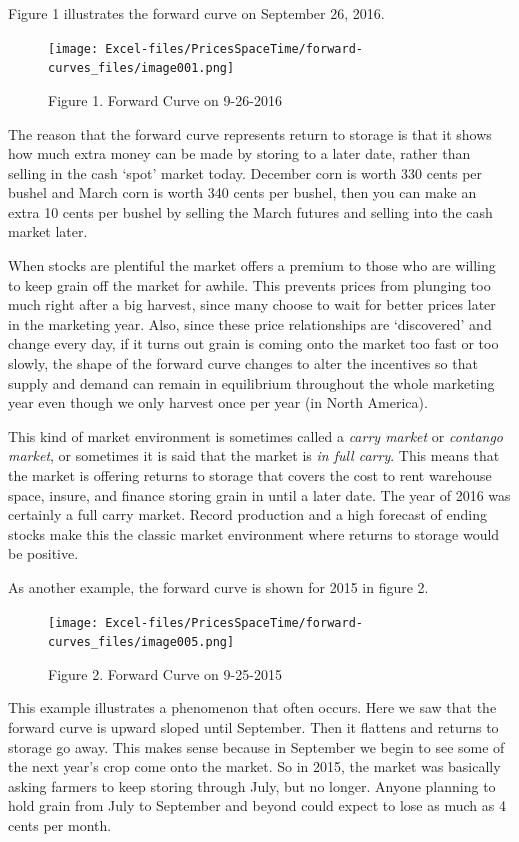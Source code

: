 \documentclass[
]{book}
\begin{document}
Figure 1 illustrates the forward curve on September 26, 2016.

\begin{figure}
\centering
\texttt{[image: Excel-files/PricesSpaceTime/forward-curves\_files/image001.png]}
\caption{Figure 1. Forward Curve on 9-26-2016}
\end{figure}

The reason that the forward curve represents return to storage is that it shows how much extra money can be made by storing to a later date, rather than selling in the cash `spot' market today. December corn is worth 330 cents per bushel and March corn is worth 340 cents per bushel, then you can make an extra 10 cents per bushel by selling the March futures and selling into the cash market later.

When stocks are plentiful the market offers a premium to those who are willing to keep grain off the market for awhile. This prevents prices from plunging too much right after a big harvest, since many choose to wait for better prices later in the marketing year. Also, since these price relationships are `discovered' and change every day, if it turns out grain is coming onto the market too fast or too slowly, the shape of the forward curve changes to alter the incentives so that supply and demand can remain in equilibrium throughout the whole marketing year even though we only harvest once per year (in North America).

This kind of market environment is sometimes called a \emph{carry market} or \emph{contango market}, or sometimes it is said that the market is \emph{in full carry}. This means that the market is offering returns to storage that covers the cost to rent warehouse space, insure, and finance storing grain in until a later date. The year of 2016 was certainly a full carry market. Record production and a high forecast of ending stocks make this the classic market environment where returns to storage would be positive.

As another example, the forward curve is shown for 2015 in figure 2.

\begin{figure}
\centering
\texttt{[image: Excel-files/PricesSpaceTime/forward-curves\_files/image005.png]}
\caption{Figure 2. Forward Curve on 9-25-2015}
\end{figure}

This example illustrates a phenomenon that often occurs. Here we saw that the forward curve is upward sloped until September. Then it flattens and returns to storage go away. This makes sense because in September we begin to see some of the next year's crop come onto the market. So in 2015, the market was basically asking farmers to keep storing through July, but no longer. Anyone planning to hold grain from July to September and beyond could expect to lose as much as 4 cents per month.
\end{document}
